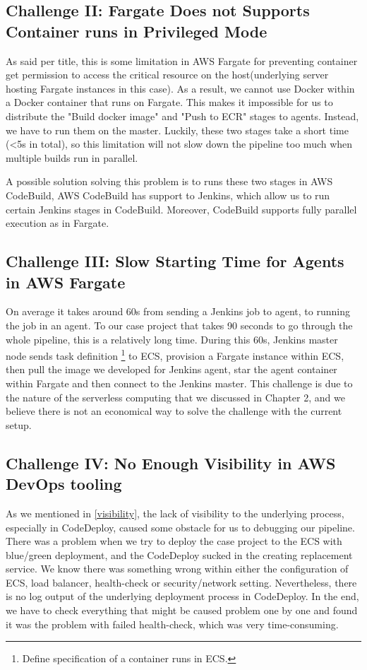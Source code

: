 \subsection{Challenge II: Fargate Does not Supports Container runs in Privileged Mode}
As said per title, this is some limitation in AWS Fargate for preventing container get permission to access the critical resource on the host(underlying server hosting Fargate instances in this case). As a result, we cannot use Docker within a Docker container that runs on Fargate. This makes it impossible for us to distribute the "Build docker image" and "Push to ECR" stages to agents. Instead, we have to run them on the master. Luckily, these two stages take a short time (<5s in total), so this limitation will not slow down the pipeline too much when multiple builds run in parallel.
\par
A possible solution solving this problem is to runs these two stages in AWS CodeBuild, AWS CodeBuild has support to Jenkins, which allow us to run certain Jenkins stages in CodeBuild. Moreover, CodeBuild supports fully parallel execution as in Fargate.
\subsection{Challenge III: Slow Starting Time for Agents in AWS Fargate}
On average it takes around 60s from sending a Jenkins job to agent, to running the job in an agent. To our case project that takes 90 seconds to go through the whole pipeline, this is a relatively long time. During this 60s, Jenkins master node sends task definition \footnote{Define specification of a container runs in ECS.} to ECS, provision a Fargate instance within ECS, then pull the image we developed for Jenkins agent, star the agent container within Fargate and then connect to the Jenkins master. This challenge is due to the nature of the serverless computing that we discussed in Chapter 2, and we believe there is not an economical way to solve the challenge with the current setup.
\subsection{Challenge IV: No Enough Visibility in AWS DevOps tooling}
As we mentioned in \ref{visibility}, the lack of visibility to the underlying process, especially in CodeDeploy, caused some obstacle for us to debugging our pipeline. There was a problem when we try to deploy the case project to the ECS with blue/green deployment, and the CodeDeploy sucked in the creating replacement service. We know there was something wrong within either the configuration of ECS, load balancer, health-check or security/network setting. Nevertheless, there is no log output of the underlying deployment process in CodeDeploy. In the end, we have to check everything that might be caused problem one by one and found it was the problem with failed health-check, which was very time-consuming.